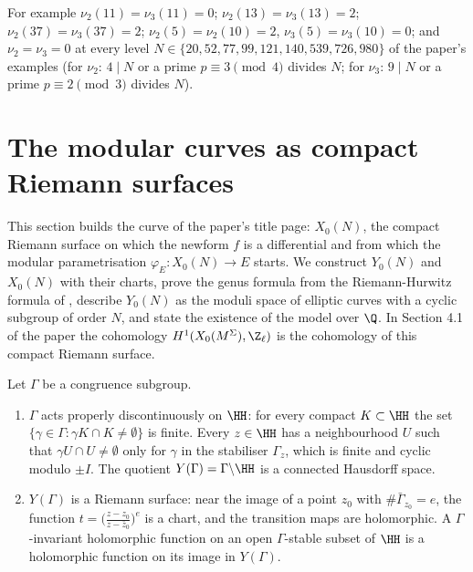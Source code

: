 For example $\nu_2(11)=\nu_3(11)=0$; $\nu_2(13)=\nu_3(13)=2$; $\nu_2(37)=\nu_3(37)=2$; $\nu_2(5)=\nu_2(10)=2$, $\nu_3(5)=\nu_3(10)=0$; and $\nu_2=\nu_3=0$ at every level
$N\in\{20,52,77,99,121,140,539,726,980\}$ of the paper's examples (for $\nu_2$: $4\mid N$ or a prime $p\equiv3\pmod4$ divides $N$; for $\nu_3$: $9\mid N$ or a prime
$p\equiv2\pmod3$ divides $N$).

\section{The modular curves as compact Riemann surfaces}\label{sec:modforms:modular-curves}

This section builds the curve of the paper's title page: $X_0(N)$, the compact Riemann surface on which the newform $f$ is a differential and from which
the modular parametrisation $\varphi_E\colon X_0(N)\to E$ starts. We construct $Y_0(N)$ and $X_0(N)$ with their charts, prove the genus formula from the
Riemann-Hurwitz formula of , describe $Y_0(N)$ as the moduli space of elliptic curves with a cyclic subgroup of order $N$, and state the
existence of the model over $\Q$. In Section 4.1 of the paper the cohomology $H^1(X_0(M^\Sigma),\Z_\ell)$ is the cohomology of this compact Riemann surface.

\begin{theorem}\label{thm:modforms:y0-riemann-surface}
Let $\Gamma$ be a congruence subgroup.
\begin{enumerate}[label=(\roman*)]
\item $\Gamma$ acts properly discontinuously on $\HH$: for every compact $K\subset\HH$ the set $\{\gamma\in\Gamma:\gamma K\cap K\ne\emptyset\}$ is finite. Every $z\in\HH$ has a
neighbourhood $U$ such that $\gamma U\cap U\ne\emptyset$ only for $\gamma$ in the stabiliser $\Gamma_z$, which is finite and cyclic modulo $\pm I$. The quotient $Y(\Gamma)=\Gamma\backslash\HH$ is a
connected Hausdorff space.
\item $Y(\Gamma)$ is a Riemann surface: near the image of a point $z_0$ with $\#\bar\Gamma_{z_0}=e$, the function $t=\bigl(\frac{z-z_0}{z-\bar z_0}\bigr)^e$ is a chart, and the
transition maps are holomorphic. A $\Gamma$-invariant holomorphic function on an open $\Gamma$-stable subset of $\HH$ is a holomorphic function on its image in
$Y(\Gamma)$.
\end{enumerate}
\end{theorem}

